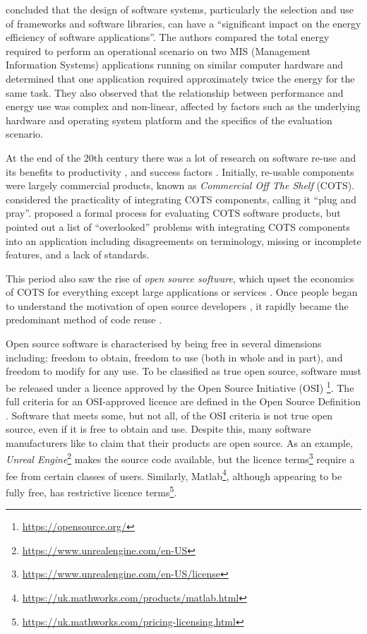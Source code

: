 \citet{Capra2012} concluded that the design of software systems, particularly the selection and use of frameworks and software libraries, can have a \enquote{significant impact on the energy efficiency of software applications}. The authors compared the total energy required to perform an operational scenario on two MIS (Management Information Systems) applications running on similar computer hardware and determined that one application required approximately twice the energy for the same task. They also observed that the relationship between performance and energy use was complex and non-linear, affected by factors such as the underlying hardware and operating system platform and the specifics of the evaluation scenario.

At the end of the 20th century there was a lot of research on software re-use and its benefits to productivity \citep{Lim1994} \citep{Basili1996}, and success factors \citep{Frakes1994} \citep{Kim1998}.  Initially, re-usable components were largely commercial products, known as \emph{Commercial Off The Shelf} (COTS). \citet{Boehm1999} considered the practicality of integrating COTS components, calling it \enquote{plug and pray}. \citet{Lawlis2001} proposed a formal process for evaluating COTS software products, but \citet{Torchiano2004} pointed out a list of \enquote{overlooked} problems with integrating COTS components into an application including disagreements on terminology, missing or incomplete features, and a lack of standards.

This period also saw the rise of \emph{open source software}, which upset the economics of COTS for everything except large applications or services \citep{Lerner2002}. Once people began to understand the motivation of open source developers \citep{Hertel2003} \citep{Lakhani2003}, it rapidly became the predominant method of code reuse \citep{Mockus2007} \citep{Haefliger2008} \citep{Sojer2010}.

\label{A29}
Open source software is characterised by being free in several dimensions including: freedom to obtain, freedom to use (both in whole and in part), and freedom to modify for any use. To be classified as true open source, software must be released under a licence approved by the Open Source Initiative (OSI) \footnote{\url{https://opensource.org/}}. The full criteria for an OSI-approved licence are defined in the Open 
Source Definition \citep{OpenSourceInitiative2024}. Software that meets some, but not all, of the OSI criteria is not true open source, even if it is free to obtain and use. Despite this, many software manufacturers like to claim that their products are open source. As an example, \emph{Unreal Engine}\footnote{\url{https://www.unrealengine.com/en-US}} makes the source code available, but the licence terms\footnote{\url{https://www.unrealengine.com/en-US/license}} require a fee from certain classes of users. Similarly, Matlab\footnote{\url{https://uk.mathworks.com/products/matlab.html}}, although appearing to be fully free, has restrictive licence terms\footnote{\url{https://uk.mathworks.com/pricing-licensing.html}}.

